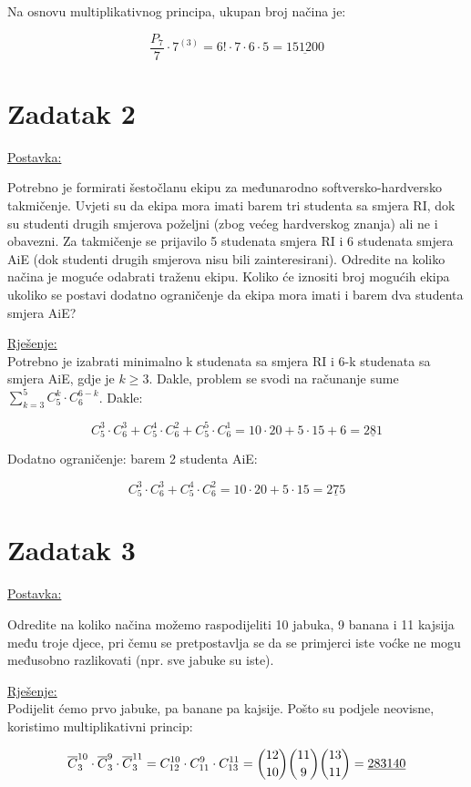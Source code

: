 \documentclass[12pt]{article}
\begin{document}
Na osnovu multiplikativnog principa, ukupan broj načina je:

$$\frac{P_{7}}{7} \cdot 7^{(3)} = 6! \cdot 7 \cdot 6 \cdot 5 = \underline{151200}$$
\newpage
\section*{Zadatak 2\label{Z2}}

\underline{Postavka:}

Potrebno je formirati šestočlanu ekipu za međunarodno softversko-hardversko takmičenje. Uvjeti su da ekipa mora imati barem tri studenta sa smjera RI, dok su studenti drugih smjerova poželjni (zbog većeg hardverskog znanja) ali ne i obavezni. Za takmičenje se prijavilo 5 studenata smjera RI i 6 studenata smjera AiE (dok studenti drugih smjerova nisu bili zainteresirani). Odredite na koliko načina je moguće odabrati traženu ekipu. Koliko će iznositi broj mogućih ekipa ukoliko se postavi dodatno ograničenje da ekipa mora imati i barem dva studenta smjera AiE?

\underline{Rješenje:}\\

Potrebno je izabrati minimalno k studenata sa smjera RI i 6-k studenata sa smjera AiE, gdje je $k \geq 3$. Dakle, problem se svodi na računanje sume $\sum_{k=3}^{5} C_{5}^k \cdot C_{6}^{6-k}$. Dakle:

$$C_{5}^3 \cdot C_{6}^3 + C_{5}^4 \cdot C_{6}^2 +  C_{5}^5 \cdot C_{6}^1 = 10 \cdot 20 + 5 \cdot 15 + 6 = \underline{281}$$

Dodatno ograničenje: barem 2 studenta AiE:

$$C_{5}^3 \cdot C_{6}^3 + C_{5}^4 \cdot C_{6}^2 = 10 \cdot 20 + 5 \cdot 15 = \underline{275}$$
\newpage
\section*{Zadatak 3\label{Z3}}

\underline{Postavka:}

Odredite na koliko načina možemo raspodijeliti 10 jabuka, 9 banana i 11 kajsija među troje djece, pri čemu se pretpostavlja se da se primjerci iste voćke ne mogu međusobno razlikovati (npr. sve jabuke su iste).

\underline{Rješenje:}\\

Podijelit ćemo prvo jabuke, pa banane pa kajsije. Pošto su podjele neovisne, koristimo multiplikativni princip:

$$\overline{C}_{3}^{10} \cdot \overline{C}_{3}^9 \cdot \overline{C}_{3}^{11} = C_{12}^{10} \cdot C_{11}^9 \cdot C_{13}^{11} = \dbinom{12}{10} \dbinom{11}{9} \dbinom{13}{11} = \underline{283140}$$
\newpage
\end{document}
